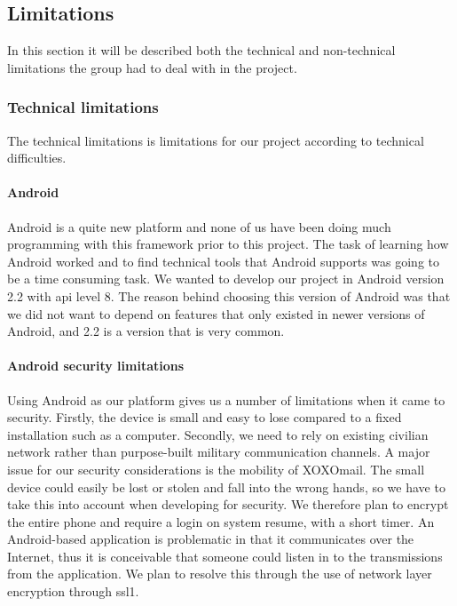 \subsection{Limitations}
In this section it will be described both the technical and non-technical limitations the group had to deal with in the project.

\subsubsection{Technical limitations}
The technical limitations is limitations for our project according to technical difficulties.
\paragraph{Android}\hfill
\newline
Android is a quite new platform and none of us have been doing much programming with this framework prior to this project. The task of learning how Android worked and to find technical tools that Android supports was going to be a time consuming task. We wanted to develop our project in Android version 2.2 with \gls{api} level 8. The reason behind choosing this version of Android was that we did not want to depend on features that only existed in newer versions of Android, and 2.2 is a version that is very common.

\paragraph{Android security limitations}\hfill
\newline
Using Android as our platform gives us a number of limitations when it came to security. Firstly, the device is small and easy to lose compared to a fixed installation such as a computer. Secondly, we need to rely on existing civilian network rather than purpose-built military communication channels.
\newline
\newline
A major issue for our security considerations is the mobility of XOXOmail. The small device could easily be lost or stolen and fall into the wrong hands, so we have to take this into account when developing for security. We therefore plan to encrypt the entire phone and require a login on system resume, with a short timer.
\newline
\newline
An Android-based application is problematic in that it communicates over the Internet, thus it is conceivable that someone could listen in to the transmissions from the application. We plan to resolve this through the use of network layer encryption through \gls{ssl1}. 

